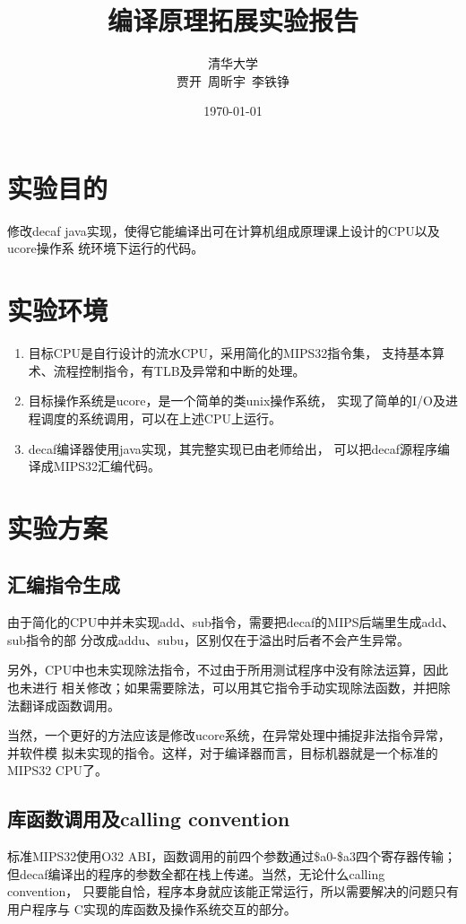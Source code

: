 \documentclass[a4paper]{article}
\title{编译原理拓展实验报告}
\author{清华大学\\贾开~周昕宇~李铁铮}
\date{\today}
\begin{document}
\maketitle

\tableofcontents

\section{实验目的}
修改decaf java实现，使得它能编译出可在计算机组成原理课上设计的CPU以及ucore操作系
统环境下运行的代码。

\section{实验环境}
\begin{enumerate}
	\item 目标CPU是自行设计的流水CPU，采用简化的MIPS32指令集，
		支持基本算术、流程控制指令，有TLB及异常和中断的处理。
	\item 目标操作系统是ucore，是一个简单的类unix操作系统，
		实现了简单的I/O及进程调度的系统调用，可以在上述CPU上运行。
	\item decaf编译器使用java实现，其完整实现已由老师给出，
		可以把decaf源程序编译成MIPS32汇编代码。
\end{enumerate}


\section{实验方案}
\subsection{汇编指令生成}
由于简化的CPU中并未实现add、sub指令，需要把decaf的MIPS后端里生成add、sub指令的部
分改成addu、subu，区别仅在于溢出时后者不会产生异常。

另外，CPU中也未实现除法指令，不过由于所用测试程序中没有除法运算，因此也未进行
相关修改；如果需要除法，可以用其它指令手动实现除法函数，并把除法翻译成函数调用。

当然，一个更好的方法应该是修改ucore系统，在异常处理中捕捉非法指令异常，并软件模
拟未实现的指令。这样，对于编译器而言，目标机器就是一个标准的MIPS32 CPU了。

\subsection{库函数调用及calling convention}
标准MIPS32使用O32 ABI，函数调用的前四个参数通过\$a0-\$a3四个寄存器传输；
但decaf编译出的程序的参数全都在栈上传递。当然，无论什么calling convention，
只要能自恰，程序本身就应该能正常运行，所以需要解决的问题只有用户程序与
C实现的库函数及操作系统交互的部分。
\end{document}
